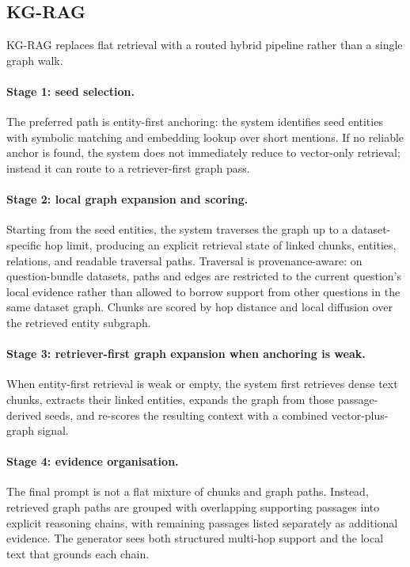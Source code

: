 \subsection{KG-RAG}
\label{sec:kg_rag}

KG-RAG replaces flat retrieval with a routed hybrid pipeline rather than a
single graph walk.

\paragraph{Stage 1: seed selection.}
The preferred path is entity-first anchoring: the system identifies seed
entities with symbolic matching and embedding lookup over short mentions.
If no reliable anchor is found, the system does not immediately reduce to
vector-only retrieval; instead it can route to a retriever-first graph pass.

\paragraph{Stage 2: local graph expansion and scoring.}
Starting from the seed entities, the system traverses the graph up to a
dataset-specific hop limit, producing an explicit retrieval state of linked
chunks, entities, relations, and readable traversal paths.
Traversal is provenance-aware: on question-bundle datasets, paths and edges are
restricted to the current question's local evidence rather than allowed to
borrow support from other questions in the same dataset graph.
Chunks are scored by hop distance and local diffusion over the retrieved
entity subgraph.

\paragraph{Stage 3: retriever-first graph expansion when anchoring is weak.}
When entity-first retrieval is weak or empty, the system first retrieves dense
text chunks, extracts their linked entities, expands the graph from those
passage-derived seeds, and re-scores the resulting context with a combined
vector-plus-graph signal.

\paragraph{Stage 4: evidence organisation.}
The final prompt is not a flat mixture of chunks and graph paths.
Instead, retrieved graph paths are grouped with overlapping supporting passages
into explicit reasoning chains, with remaining passages listed separately as
additional evidence.
The generator sees both structured multi-hop support and the local text that
grounds each chain.

